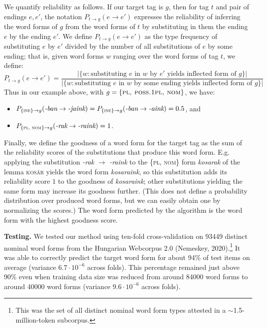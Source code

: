 \documentclass[12pt, a4paper]{article}
\begin{document}
We quantify reliability as follows. If our target tag is $ g $, then for tag $ t $ and pair of endings $ e, e' $, the notation $ {P_{t \to g}(e \to e')} $ expresses the reliability of inferring the word forms of $ g $ from the word forms of $ t $ by substituting in them the ending $ e $ by the ending $ e' $. We define $ P_{t \to g}(e \to e') $ as the type frequency of substituting $ e $ by $ e' $ divided by the number of all substitutions of $ e $ by some ending; that is, given word forms $ w $ ranging over the word forms of tag $ t $, we define:
\begin{equation*}
P_{t \to g}(e \to e') = \frac{|\{w : \textrm{substituting } e \textrm{ in } w \textrm{ by } e' \textrm{ yields inflected form of } g\}|}{|\{w : \textrm{substituting } e \textrm{ in } w \textrm{ by some ending yields inflected form of } g\}|}
\end{equation*}
Thus in our example above, with $ g = \{\textsc{pl, poss.1pl, nom}\} $, we have:
\begin{itemize}
  \item $ P_{\{\textsc{ine}\} \to g}(\textit{-ban} \to \textit{-jaink}) = P_{\{\textsc{ine}\} \to g}(\textit{-ban} \to \textit{-aink}) = 0.5 $, and
  \item $ P_{\{\textsc{pl, nom}\} \to g}(\textit{-rak} \to \textit{-raink}) = 1 $.
\end{itemize}

Finally, we define the goodness of a word form for the target tag as the sum of the reliability scores of the substitutions that produce this word form. E.g. applying the substitution \textit{-rak} $ \to $ \textit{-raink} to the \{\textsc{pl, nom}\} form \textit{kosarak} of the lemma \textsc{kosár} yields the word form \textit{kosaraink}, so this substitution adds its reliability score $ 1 $ to the goodness of \textit{kosaraink}; other substitutions yielding the same form may increase its goodness further. (This does not define a probability distribution over produced word forms, but we can easily obtain one by normalizing the scores.) The word form predicted by the algorithm is the word form with the highest goodness score.

\textbf{Testing.} We tested our method using ten-fold cross-validation on 93449 distinct nominal word forms from the Hungarian Webcorpus 2.0 (Nemeskey, 2020).\footnote{This was the set of all distinct nominal word form types attested in a $ \sim $1.5-million-token subcorpus.} It was able to correctly predict the target word form for about 94\% of test items on average (variance $ 6.7 \cdot 10^{-6} $ across folds). This percentage remained just above 90\% even when training data size was reduced from around 84000 word forms to around 40000 word forms (variance $ 9.6 \cdot10^{-6} $ across folds).
\end{document}
